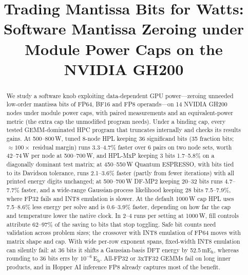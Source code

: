 \documentclass[conference]{IEEEtran}
\newcommand{\W}{\,W}
\newcommand{\Eh}{\,E$_\mathrm{h}$}
\newcommand{\pct}{\%}
\begin{document}

\title{Trading Mantissa Bits for Watts: Software Mantissa Zeroing under Module Power Caps on the NVIDIA GH200}

\author{
}

\maketitle

\begin{abstract}
We study a software knob exploiting data-dependent GPU power---zeroing unneeded low-order mantissa bits of FP64,
BF16 and FP8 operands---on 14 NVIDIA GH200 nodes under module power caps, with paired measurements and an
equivalent-power metric (the extra cap the unmodified program needs). Under a binding cap, every tested GEMM-dominated HPC
program that truncates internally and checks its results gains. At 500--800\W, tuned 8-node HPL keeping 36 significand
bits (35 fraction bits; ${\approx}100\times$ residual margin) runs 3.3--4.7\pct{} faster over 6 pairs on two node sets,
worth 42--74\W{} per node at 500--700\W, and HPL-MxP keeping 3 bits 1.7--5.8\pct{} on a diagonally dominant test
matrix; at 450--550\W{} Quantum ESPRESSO, with bits tied to its
Davidson tolerance, runs 2.1--3.6\pct{} faster (partly from fewer iterations) with all printed energy digits
unchanged; at 500--700\W{} DF-MP2 keeping 20--32 bits runs 4.7--7.7\pct{} faster, and a wide-range
Gaussian-process likelihood keeping 28 bits 7.5--7.9\pct, where FP32 fails and INT8 emulation is slower. At the
default 1000\W{} cap HPL uses 7.5--8.6\pct{} less energy per solve and is 0.6--3.9\pct{} faster, depending on how far
the cap and temperature lower the native clock. In 2--4 runs per setting at 1000\W, fill controls attribute 62--97\pct{} of the saving to bits
that stop toggling. Safe bit counts need validation across problem sizes; the crossover with INT8 emulation of FP64 moves with matrix shape and cap. With wide per-row exponent spans,
fixed-width INT8 emulation can silently fail: at 36 bits it shifts a Gaussian-basis DFT energy by
52.5\,mE$_\mathrm{h}$, whereas rounding to 36 bits errs by $10^{-6}$\Eh. All-FP32 or 3xTF32 GEMMs fail on long inner
products, and in Hopper AI inference FP8 already captures most of the benefit.
\end{abstract}
\end{document}
